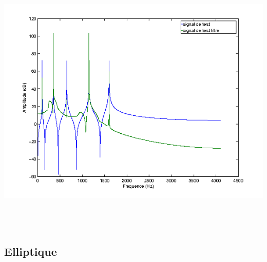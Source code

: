 \documentclass{article}
\begin{document}
\includegraphics[height=13cm]{cheb2_3}

\subsection{Elliptique}
\end{document}
